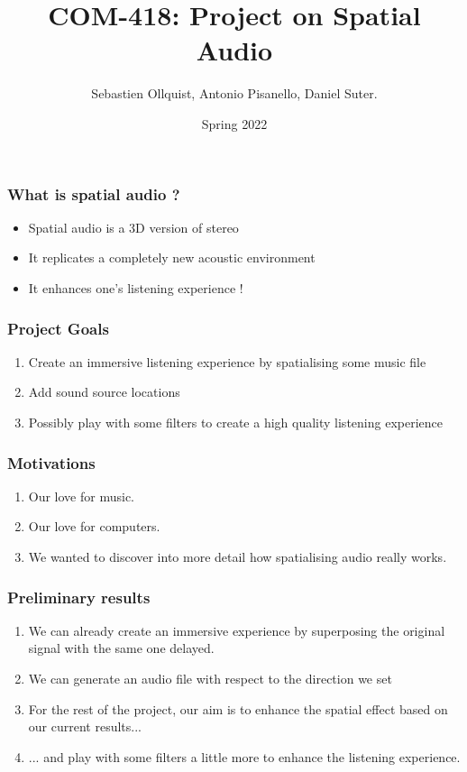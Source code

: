 \documentclass{beamer}
\title{COM-418: Project on Spatial Audio}
\author{Sebastien Ollquist, Antonio Pisanello, Daniel Suter.}
\institute{EPFL}
\date{Spring 2022}
\begin{document}
\frame{\titlepage}

\begin{frame}
    \frametitle{What is spatial audio ?}
    \begin{itemize}
        \item Spatial audio is a 3D version of stereo
        \item It replicates a completely new acoustic environment
        \item It enhances one's listening experience !
    \end{itemize}
\end{frame}

\begin{frame}
    \frametitle{Project Goals}
    \begin{enumerate}
        \item Create an immersive listening experience by spatialising some music file
        \item Add sound source locations
        \item Possibly play with some filters to create a high quality listening experience
    \end{enumerate}
\end{frame}

\begin{frame}
    \frametitle{Motivations}
    \begin{enumerate}
        \item Our love for music.
        \item Our love for computers.
        \item We wanted to discover into more detail how spatialising audio really works.
    \end{enumerate}
\end{frame}

\begin{frame}
    \frametitle{Preliminary results}
    \begin{enumerate}
        \item We can already create an immersive experience by superposing the original signal with the same one delayed.
        \item We can generate an audio file with respect to the direction we set
        \item For the rest of the project, our aim is to enhance the spatial effect based on our current results...
        \item ... and play with some filters a little more to enhance the listening experience.
    \end{enumerate}
\end{frame}
\end{document}

